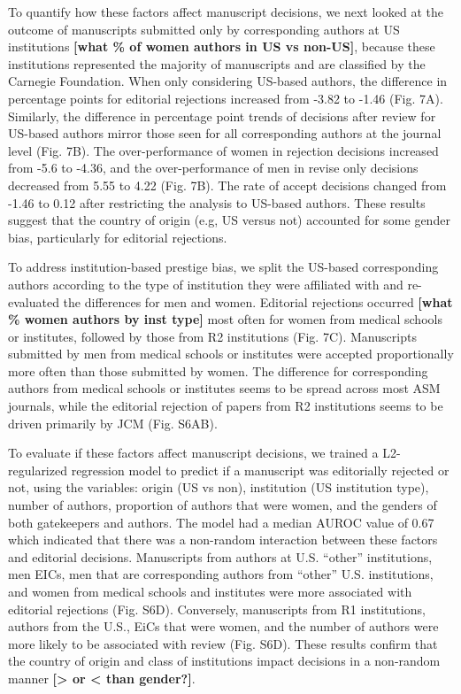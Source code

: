 \documentclass[11pt,]{article}
\begin{document}
To quantify how these factors affect manuscript decisions, we next
looked at the outcome of manuscripts submitted only by corresponding
authors at US institutions \textbf{{[}what \% of women authors in US vs
non-US{]}}, because these institutions represented the majority of
manuscripts and are classified by the Carnegie Foundation. When only
considering US-based authors, the difference in percentage points for
editorial rejections increased from -3.82 to -1.46 (Fig. 7A). Similarly,
the difference in percentage point trends of decisions after review for
US-based authors mirror those seen for all corresponding authors at the
journal level (Fig. 7B). The over-performance of women in rejection
decisions increased from -5.6 to -4.36, and the over-performance of men
in revise only decisions decreased from 5.55 to 4.22 (Fig. 7B). The rate
of accept decisions changed from -1.46 to 0.12 after restricting the
analysis to US-based authors. These results suggest that the country of
origin (e.g, US versus not) accounted for some gender bias, particularly
for editorial rejections.

To address institution-based prestige bias, we split the US-based
corresponding authors according to the type of institution they were
affiliated with and re-evaluated the differences for men and women.
Editorial rejections occurred \textbf{{[}what \% women authors by inst
type{]}} most often for women from medical schools or institutes,
followed by those from R2 institutions (Fig. 7C). Manuscripts submitted
by men from medical schools or institutes were accepted proportionally
more often than those submitted by women. The difference for
corresponding authors from medical schools or institutes seems to be
spread across most ASM journals, while the editorial rejection of papers
from R2 institutions seems to be driven primarily by JCM (Fig. S6AB).

To evaluate if these factors affect manuscript decisions, we trained a
L2-regularized regression model to predict if a manuscript was
editorially rejected or not, using the variables: origin (US vs non),
institution (US institution type), number of authors, proportion of
authors that were women, and the genders of both gatekeepers and
authors. The model had a median AUROC value of 0.67 which indicated that
there was a non-random interaction between these factors and editorial
decisions. Manuscripts from authors at U.S. ``other'' institutions, men
EICs, men that are corresponding authors from ``other'' U.S.
institutions, and women from medical schools and institutes were more
associated with editorial rejections (Fig. S6D). Conversely, manuscripts
from R1 institutions, authors from the U.S., EiCs that were women, and
the number of authors were more likely to be associated with review
(Fig. S6D). These results confirm that the country of origin and class
of institutions impact decisions in a non-random manner
\textbf{{[}\textgreater{} or \textless{} than gender?{]}}.
\end{document}
